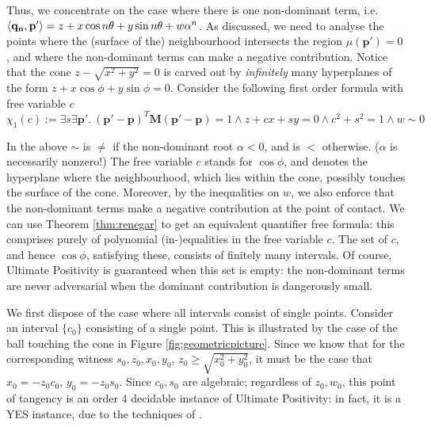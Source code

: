 Thus, we concentrate on the case where there is one non-dominant term, i.e. $\langle\mathbf{q_n}, \mathbf{p'}\rangle = z + x\cos n\theta + y\sin n\theta + w\alpha^n$. As discussed, we need to analyse the points where the (surface of the) neighbourhood intersects the region $\mu(\mathbf{p'}) = 0$, and where the non-dominant terms can make a negative contribution. Notice that the cone $z - \sqrt{x^2 + y^2} = 0$ is carved out by \textit{infinitely} many hyperplanes of the form $z + x\cos\phi + y\sin\phi = 0$. Consider the following first order formula with free variable $c$
\begin{equation}
\label{eq:intersection}
\chi_1(c):= \exists s \exists \mathbf{p'}.~ (\mathbf{p'} - \mathbf{p})^T\mathbf{M}(\mathbf{p'} - \mathbf{p}) = 1 \land z + cx + sy = 0 \land c^2 + s^2 = 1 \land w \sim 0
\end{equation}

In the above $\sim$ is $\ne$ if the non-dominant root $\alpha < 0$, and is $<$ otherwise. ($\alpha$ is necessarily nonzero!) The free variable $c$ stands for $\cos \phi$, and denotes the hyperplane where the neighbourhood, which lies within the cone, possibly touches the surface of the cone. Moreover, by the inequalities on $w$, we also enforce that the non-dominant terms make a negative contribution at the point of contact. We can use Theorem \ref{thm:renegar} to get an equivalent quantifier free formula: this comprises purely of polynomial (in-)equalities in the free variable $c$. The set of $c$, and hence $\cos \phi$, satisfying these, consists of finitely many intervals. Of course, Ultimate Positivity is guaranteed when this set is empty: the non-dominant terms are never adversarial when the dominant contribution is dangerously small.

We first dispose of the case where all intervals consist of single points. Consider an interval $\{c_0\}$ consisting of a single point. This is illustrated by the case of the ball touching the cone in Figure \ref{fig:geometricpicture}. Since we know that for the corresponding witness $s_0, z_0, x_0, y_0$, $z_0 \ge \sqrt{x_0^2 + y_0^2}$, it must be the case that $x_0 = -z_0c_0$, $y_0 = -z_0s_0$. Since $c_0, s_0$ are algebraic; regardless of $z_0, w_0$, this point of tangency is an order 4 decidable instance of Ultimate Positivity: in fact, it is a YES instance, due to the techniques of \cite{ouaknine2014ultimate}.

